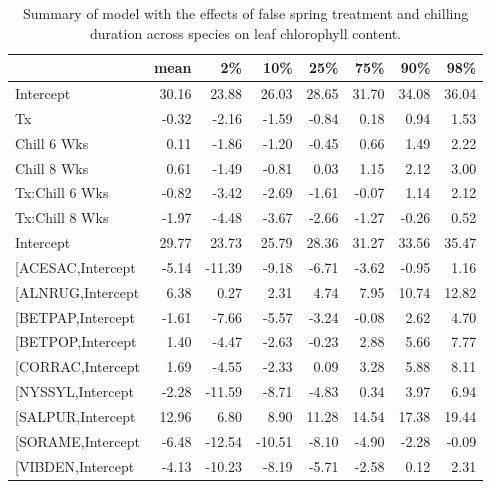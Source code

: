 \documentclass{article}\usepackage[]{graphicx}\usepackage[]{color}
\makeatletter
\newenvironment{kframe}{%
 \def\at@end@of@kframe{}%
 \ifinner\ifhmode%
  \def\at@end@of@kframe{\end{minipage}}%
  \begin{minipage}{\columnwidth}%
 \fi\fi%
 \def\FrameCommand##1{\hskip\@totalleftmargin \hskip-\fboxsep
 \colorbox{shadecolor}{##1}\hskip-\fboxsep
     \hskip-\linewidth \hskip-\@totalleftmargin \hskip\columnwidth}%
 \MakeFramed {\advance\hsize-\width
   \@totalleftmargin\z@ \linewidth\hsize
   \@setminipage}}%
 {\par\unskip\endMakeFramed%
 \at@end@of@kframe}
\makeatother
\begin{document}
\newpage
\begin{kframe}


{\ttfamily\noindent\bfseries\color{errorcolor}{\#\# Error in gsub("{}["{}, "{}"{}, modoutput\$term): invalid regular expression '[', reason 'Missing ']''}}\end{kframe}%
\begin{longtable}{lrrrrrrr}
\caption{Summary of model with the effects of false spring treatment and chilling duration across species on leaf chlorophyll content.} \\ 
  \hline
 & mean & 2\% & 10\% & 25\% & 75\% & 90\% & 98\% \\ 
  \hline \endhead  \hline
Intercept & 30.16 & 23.88 & 26.03 & 28.65 & 31.70 & 34.08 & 36.04 \\ 
  Tx & -0.32 & -2.16 & -1.59 & -0.84 & 0.18 & 0.94 & 1.53 \\ 
  Chill 6 Wks & 0.11 & -1.86 & -1.20 & -0.45 & 0.66 & 1.49 & 2.22 \\ 
  Chill 8 Wks & 0.61 & -1.49 & -0.81 & 0.03 & 1.15 & 2.12 & 3.00 \\ 
  Tx:Chill 6 Wks & -0.82 & -3.42 & -2.69 & -1.61 & -0.07 & 1.14 & 2.12 \\ 
  Tx:Chill 8 Wks & -1.97 & -4.48 & -3.67 & -2.66 & -1.27 & -0.26 & 0.52 \\ 
  Intercept & 29.77 & 23.73 & 25.79 & 28.36 & 31.27 & 33.56 & 35.47 \\ 
  [ACESAC,Intercept & -5.14 & -11.39 & -9.18 & -6.71 & -3.62 & -0.95 & 1.16 \\ 
  [ALNRUG,Intercept & 6.38 & 0.27 & 2.31 & 4.74 & 7.95 & 10.74 & 12.82 \\ 
  [BETPAP,Intercept & -1.61 & -7.66 & -5.57 & -3.24 & -0.08 & 2.62 & 4.70 \\ 
  [BETPOP,Intercept & 1.40 & -4.47 & -2.63 & -0.23 & 2.88 & 5.66 & 7.77 \\ 
  [CORRAC,Intercept & 1.69 & -4.55 & -2.33 & 0.09 & 3.28 & 5.88 & 8.11 \\ 
  [NYSSYL,Intercept & -2.28 & -11.59 & -8.71 & -4.83 & 0.34 & 3.97 & 6.94 \\ 
  [SALPUR,Intercept & 12.96 & 6.80 & 8.90 & 11.28 & 14.54 & 17.38 & 19.44 \\ 
  [SORAME,Intercept & -6.48 & -12.54 & -10.51 & -8.10 & -4.90 & -2.28 & -0.09 \\ 
  [VIBDEN,Intercept & -4.13 & -10.23 & -8.19 & -5.71 & -2.58 & 0.12 & 2.31 \\ 

\end{longtable}
\end{document}
